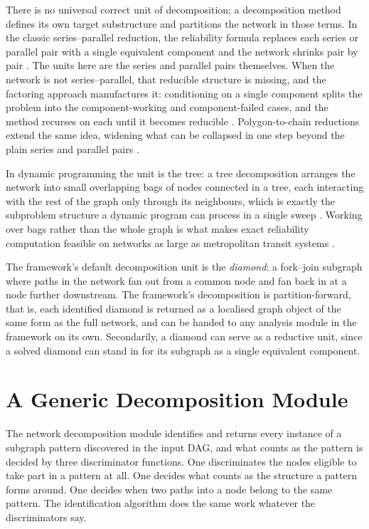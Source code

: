 \documentclass[12pt]{report}
\begin{document}
There is no universal correct unit of decomposition; a decomposition
method defines its own target substructure and partitions the network in
those terms. In the classic series--parallel reduction, the reliability
formula replaces each series or parallel pair with a single equivalent
component and the network shrinks pair by pair
\cite{satyanarayana1985linear}. The units here are the series and parallel
pairs themselves. When the network is not series--parallel, that reducible
structure is missing, and the factoring approach manufactures it:
conditioning on a single component splits the problem into the
component-working and component-failed cases, and the method recurses on
each until it becomes reducible
\cite{moore1956reliable,satyanarayana1983factoring,page1988practical}.
Polygon-to-chain reductions extend the same idea, widening what can be
collapsed in one step beyond the plain series and parallel pairs
\cite{wood1985polygon}.

In dynamic programming the unit is the tree: a tree decomposition arranges
the network into small overlapping bags of nodes connected in a tree, each
interacting with the rest of the graph only through its neighbours, which
is exactly the subproblem structure a dynamic program can process in a
single sweep \cite{robertson1986graphminors}. Working over bags rather
than the whole graph is what makes exact reliability computation feasible
on networks as large as metropolitan transit systems
\cite{goharshady2020treewidth}.

The framework's default decomposition unit is the \emph{diamond}: a
fork--join subgraph where paths in the network fan out from a common node and fan back in at a node further downstream. The framework's decomposition is partition-forward, that is, each identified diamond is returned as a localised graph object of the same form as the full network, and can be handed to any analysis module in the framework on its own. Secondarily, a diamond can serve as a reductive unit, since a solved diamond can stand in for its subgraph as a single equivalent component.


\section{A Generic Decomposition Module}
\label{sec:dd-genericity}

The network decomposition module identifies and returns every instance of a subgraph pattern discovered in the input DAG, and what counts as the pattern is decided by three discriminator functions. One discriminates the nodes eligible to take part in a pattern at all. One decides what counts as the structure a pattern forms around. One decides when two paths into a node belong to the same pattern. The identification algorithm does the same work whatever the discriminators say.
\end{document}
